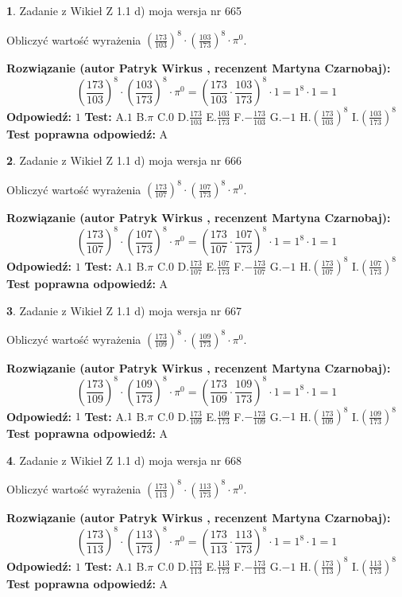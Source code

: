\documentclass[12pt, a4paper]{article}
\theoremstyle{definition} %
\newtheorem{zad}{}
\newcommand{\zadStart}[1]{\begin{zad}#1\newline}
\newcommand{\zadStop}{\end{zad}}
\newcommand{\rozwStart}[2]{\noindent \textbf{Rozwiązanie (autor #1 , recenzent #2): }\newline}
\newcommand{\rozwStop}{\newline}
\newcommand{\odpStart}{\noindent \textbf{Odpowiedź:}\newline}
\newcommand{\odpStop}{\newline}
\newcommand{\testStart}{\noindent \textbf{Test:}\newline}
\newcommand{\testStop}{\newline}
\newcommand{\kluczStart}{\noindent \textbf{Test poprawna odpowiedź:}\newline}
\newcommand{\kluczStop}{\newline}
\begin{document}
\zadStart{Zadanie z Wikieł Z 1.1 d) moja wersja nr 665}

Obliczyć wartość wyrażenia $(\frac{173}{103})^{8} \cdot (\frac{103}{173})^{8} \cdot \pi^{0}$.
\zadStop
\rozwStart{Patryk Wirkus}{Martyna Czarnobaj}
$$(\frac{173}{103})^{8} \cdot (\frac{103}{173})^{8} \cdot \pi^{0} = (\frac{173}{103} \cdot \frac{103}{173})^{8} \cdot 1 = 1^{8} \cdot 1 = 1$$
\rozwStop
\odpStart
$1$
\odpStop
\testStart
A.$1$ B.$\pi$ C.$0$ D.$\frac{173}{103}$ E.$\frac{103}{173}$
F.$-\frac{173}{103}$ G.$-1$
H.$(\frac{173}{103})^{8}$
I.$(\frac{103}{173})^{8}$
\testStop
\kluczStart
A
\kluczStop



\zadStart{Zadanie z Wikieł Z 1.1 d) moja wersja nr 666}

Obliczyć wartość wyrażenia $(\frac{173}{107})^{8} \cdot (\frac{107}{173})^{8} \cdot \pi^{0}$.
\zadStop
\rozwStart{Patryk Wirkus}{Martyna Czarnobaj}
$$(\frac{173}{107})^{8} \cdot (\frac{107}{173})^{8} \cdot \pi^{0} = (\frac{173}{107} \cdot \frac{107}{173})^{8} \cdot 1 = 1^{8} \cdot 1 = 1$$
\rozwStop
\odpStart
$1$
\odpStop
\testStart
A.$1$ B.$\pi$ C.$0$ D.$\frac{173}{107}$ E.$\frac{107}{173}$
F.$-\frac{173}{107}$ G.$-1$
H.$(\frac{173}{107})^{8}$
I.$(\frac{107}{173})^{8}$
\testStop
\kluczStart
A
\kluczStop



\zadStart{Zadanie z Wikieł Z 1.1 d) moja wersja nr 667}

Obliczyć wartość wyrażenia $(\frac{173}{109})^{8} \cdot (\frac{109}{173})^{8} \cdot \pi^{0}$.
\zadStop
\rozwStart{Patryk Wirkus}{Martyna Czarnobaj}
$$(\frac{173}{109})^{8} \cdot (\frac{109}{173})^{8} \cdot \pi^{0} = (\frac{173}{109} \cdot \frac{109}{173})^{8} \cdot 1 = 1^{8} \cdot 1 = 1$$
\rozwStop
\odpStart
$1$
\odpStop
\testStart
A.$1$ B.$\pi$ C.$0$ D.$\frac{173}{109}$ E.$\frac{109}{173}$
F.$-\frac{173}{109}$ G.$-1$
H.$(\frac{173}{109})^{8}$
I.$(\frac{109}{173})^{8}$
\testStop
\kluczStart
A
\kluczStop



\zadStart{Zadanie z Wikieł Z 1.1 d) moja wersja nr 668}

Obliczyć wartość wyrażenia $(\frac{173}{113})^{8} \cdot (\frac{113}{173})^{8} \cdot \pi^{0}$.
\zadStop
\rozwStart{Patryk Wirkus}{Martyna Czarnobaj}
$$(\frac{173}{113})^{8} \cdot (\frac{113}{173})^{8} \cdot \pi^{0} = (\frac{173}{113} \cdot \frac{113}{173})^{8} \cdot 1 = 1^{8} \cdot 1 = 1$$
\rozwStop
\odpStart
$1$
\odpStop
\testStart
A.$1$ B.$\pi$ C.$0$ D.$\frac{173}{113}$ E.$\frac{113}{173}$
F.$-\frac{173}{113}$ G.$-1$
H.$(\frac{173}{113})^{8}$
I.$(\frac{113}{173})^{8}$
\testStop
\kluczStart
A
\kluczStop
\end{document}
